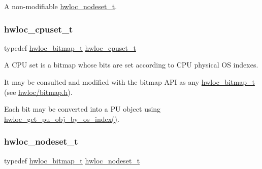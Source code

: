 A non-\/modifiable \hyperlink{a00183_ga37e35730fa7e775b5bb0afe893d6d508}{hwloc\+\_\+nodeset\+\_\+t}. 

\mbox{\label{a00183_ga4bbf39b68b6f568fb92739e7c0ea7801}} 
\subsubsection{\texorpdfstring{hwloc\+\_\+cpuset\+\_\+t}{hwloc\_cpuset\_t}}
{\footnotesize\ttfamily typedef \hyperlink{a00205_gaa3c2bf4c776d603dcebbb61b0c923d84}{hwloc\+\_\+bitmap\+\_\+t} \hyperlink{a00183_ga4bbf39b68b6f568fb92739e7c0ea7801}{hwloc\+\_\+cpuset\+\_\+t}}



A C\+PU set is a bitmap whose bits are set according to C\+PU physical OS indexes. 

It may be consulted and modified with the bitmap A\+PI as any \hyperlink{a00205_gaa3c2bf4c776d603dcebbb61b0c923d84}{hwloc\+\_\+bitmap\+\_\+t} (see \hyperlink{a00125_source}{hwloc/bitmap.\+h}).

Each bit may be converted into a PU object using \hyperlink{a00200_ga751c238a4931db5cc0ca3181b7dd7479}{hwloc\+\_\+get\+\_\+pu\+\_\+obj\+\_\+by\+\_\+os\+\_\+index()}. \mbox{\label{a00183_ga37e35730fa7e775b5bb0afe893d6d508}} 
\subsubsection{\texorpdfstring{hwloc\+\_\+nodeset\+\_\+t}{hwloc\_nodeset\_t}}
{\footnotesize\ttfamily typedef \hyperlink{a00205_gaa3c2bf4c776d603dcebbb61b0c923d84}{hwloc\+\_\+bitmap\+\_\+t} \hyperlink{a00183_ga37e35730fa7e775b5bb0afe893d6d508}{hwloc\+\_\+nodeset\+\_\+t}}



